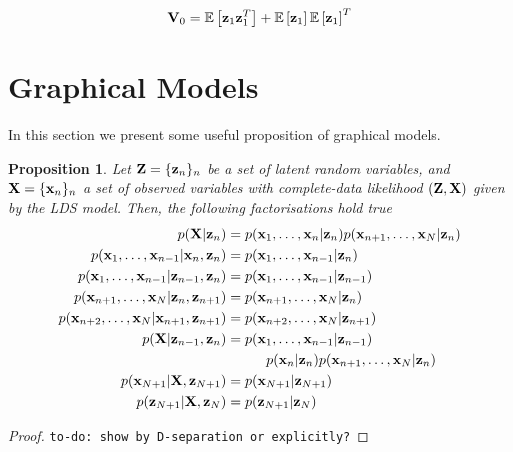 \documentclass[11pt]{article}
\newcommand{\expectation}[1]{\mathbb{E}\left[#1\right]}
\newtheorem{proposition}{Proposition}[section]
\begin{document}
\begin{equation}
	{\bf V}_0 = \expectation{{\bf z}_1 {\bf z}_1^T} + \expectation{{\bf z}_1}\expectation{{\bf z}_1}^T
\end{equation}




\section{Graphical Models}
In this section we present some useful proposition of graphical models.

\begin{proposition}\label{prop:graphical-models-separation}
	Let ${\bf Z} = \{{\bf z}_n\}_n$ be a set of latent random variables, and ${\bf X} = \{{\bf x}_n\}_n$ a set of observed variables with complete-data likelihood $({\bf Z}, {\bf X})$ given by the LDS model. Then, the following factorisations hold true
	\begin{align}
		p({\bf X}\vert{\bf z}_n) &= p({{\bf x}_1, \ldots, {\bf x}_n \vert {\bf z}_n})p({{\bf x}_{n+1}, \ldots, {\bf x}_N \vert {\bf z}_n}) \label{gm:1}\\
		p({\bf x}_1, \ldots, {\bf x}_{n-1}\vert {\bf x}_n, {\bf z}_n) &= p({\bf x}_1, \ldots, {\bf x}_{n-1}\vert {\bf z}_n)\\
		p({\bf x}_1, \ldots, {\bf x}_{n-1}\vert {\bf z}_{n-1}, {\bf z}_{n}) &= p({\bf x}_1, \ldots, {\bf x}_{n-1}\vert {\bf z}_{n-1})\\
		p({\bf x}_{n+1}, \ldots, {\bf x}_N \vert {\bf z}_n, {\bf z}_{n+1}) &= p({\bf x}_{n+1}, \ldots, {\bf x}_N \vert {\bf z}_n)\\
		p({\bf x}_{n+2}, \ldots, {\bf x}_N\vert {\bf x}_{n+1}, {\bf z}_{n+1}) &= p({\bf x}_{n+2}, \ldots, {\bf x}_N \vert {\bf z}_{n+1})\\
		p({\bf X}\vert {\bf z}_{n-1}, {\bf z}_{n}) &= p({\bf x}_1, \ldots, {\bf x}_{n-1}\vert {\bf z}_{n-1}) \nonumber\\
			&\hspace{1cm}p({\bf x}_n\vert {\bf z}_n) p({\bf x}_{n+1}, \ldots, {\bf x}_N \vert {\bf z}_n)\\
		p({\bf x}_{N+1} \vert {\bf X}, {\bf z}_{N+1}) &= p({\bf x}_{N+1} \vert {\bf z}_{N+1})\\
		p({\bf z}_{N+1} \vert {\bf X}, {\bf z}_{N}) &= p({\bf z}_{N+1} \vert {\bf z}_{N})\\
	\end{align}
\end{proposition}

\begin{proof}
	\texttt{to-do: show by D-separation or explicitly?}
\end{proof}
\end{document}
